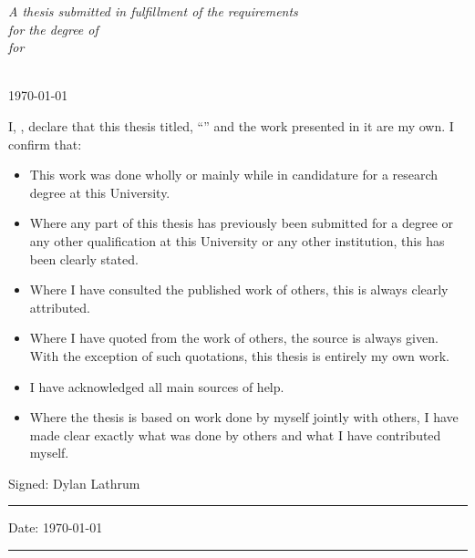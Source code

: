 \documentclass[
11pt, %
oneside, %
english, %
singlespacing, %
final, %
headsepline, %
]{MastersDoctoralThesis} %
\begin{document}
\begin{titlepage}
\begin{center}
		\vfill

		\large \textit{A thesis submitted in fulfillment of the requirements\\ for the degree of \degreename}\\[0.3cm] %
		\textit{for}\\[0.4cm]
		\deptname\\[2cm] %

		\vfill

		{\large \today}\\[4cm] %

		\vfill
	\end{center}
\end{titlepage}


\begin{declaration}
	\addchaptertocentry{\authorshipname} %
	\noindent I, \authorname, declare that this thesis titled, \enquote{\ttitle} and the work presented in it are my own. I confirm that:

	\begin{itemize}
		\item This work was done wholly or mainly while in candidature for a research degree at this University.
		\item Where any part of this thesis has previously been submitted for a degree or any other qualification at this University or any other institution, this has been clearly stated.
		\item Where I have consulted the published work of others, this is always clearly attributed.
		\item Where I have quoted from the work of others, the source is always given. With the exception of such quotations, this thesis is entirely my own work.
		\item I have acknowledged all main sources of help.
		\item Where the thesis is based on work done by myself jointly with others, I have made clear exactly what was done by others and what I have contributed myself.\\
	\end{itemize}

	\noindent Signed: Dylan Lathrum\\
	\rule[0.5em]{25em}{0.5pt} %

	\noindent Date: \today\\
	\rule[0.5em]{25em}{0.5pt} %
\end{declaration}
\end{document}
